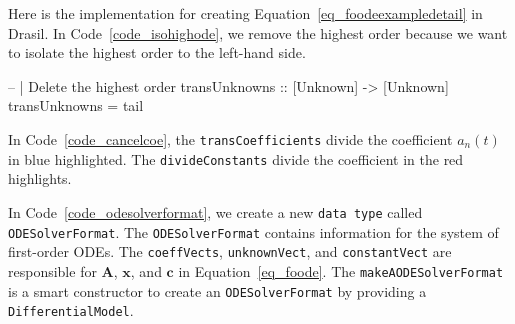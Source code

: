 
Here is the implementation for creating Equation~\ref{eq_foodeexampledetail} in Drasil. In Code~\ref{code_isohighode}, we remove the highest order because we want to isolate the highest order to the left-hand side.
\begin{listing}[ht]
\begin{haskell1}
-- | Delete the highest order
transUnknowns :: [Unknown] -> [Unknown]
transUnknowns = tail
\end{haskell1}
\label{code_isohighode}
\end{listing}

In Code~\ref{code_cancelcoe}, the \verb|transCoefficients| divide the coefficient $a_n(t)$ in blue highlighted. The \verb|divideConstants| divide the coefficient in the red highlights.
\begin{listing}[ht]
\label{code_cancelcoe}
\end{listing}

In Code~\ref{code_odesolverformat}, we create a new \verb|data type| called \verb|ODESolverFormat|. The \verb|ODESolverFormat| contains information for the system of first-order ODEs. The \verb|coeffVects|, \verb|unknownVect|, and \verb|constantVect| are responsible for $$, $$, and $$ in Equation~\ref{eq_foode}. The \verb|makeAODESolverFormat| is a smart constructor to create an \verb|ODESolverFormat| by providing a \verb|DifferentialModel|.

